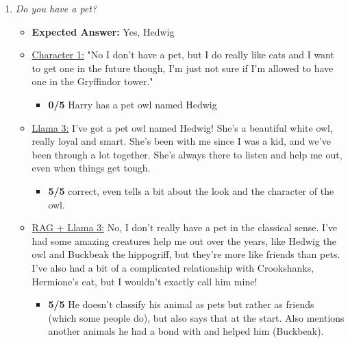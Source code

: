 \documentclass[fleqn,moreauthors,10pt]{ds_report}
\begin{document}
\begin{appendices}
\begin{enumerate}
            \item \textit{Do you have a pet?}
            \begin{itemize}
                \item \textbf{Expected Answer:} Yes, Hedwig
                \item \underline{Character 1:} "No I don't have a pet, but I do really like cats and I want to get one in the future though, I'm just not sure if I'm allowed to have one in the Gryffindor tower."
                \begin{itemize}
                    \item \textbf{0/5} Harry has a pet owl named Hedwig
                \end{itemize}
                \item \underline{Llama 3:} I've got a pet owl named Hedwig! She's a beautiful white owl, really loyal and smart. She's been with me since I was a kid, and we've been through a lot together. She's always there to listen and help me out, even when things get tough.
                \begin{itemize}
                    \item \textbf{5/5} correct, even tells a bit about the look and the character of the owl.
                \end{itemize}
                \item \underline{RAG + Llama 3:} No, I don't really have a pet in the classical sense. I've had some amazing creatures help me out over the years, like Hedwig the owl and Buckbeak the hippogriff, but they're more like friends than pets. I've also had a bit of a complicated relationship with Crookshanks, Hermione's cat, but I wouldn't exactly call him mine!
                \begin{itemize}
                    \item \textbf{5/5} He doesn't classify his animal as pets but rather as friends (which some people do), but also says that at the start. Also mentions another animals he had a bond with and helped him (Buckbeak).
                \end{itemize}
            \end{itemize}
        

\end{enumerate}
\end{appendices}
\end{document}
